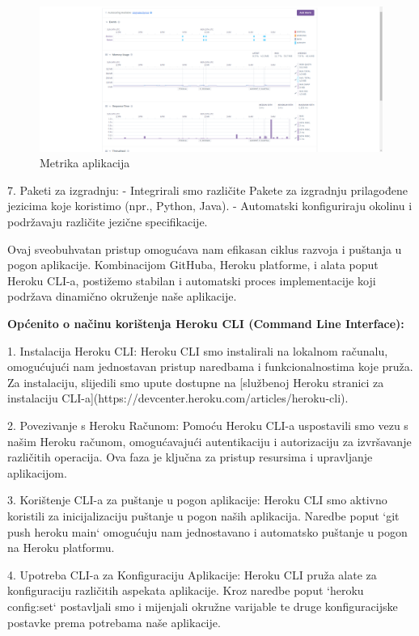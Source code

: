 \begin{figure}[H]
    \centering
    \includegraphics[width=1\linewidth]{slike/metrics.png}
    \caption{Metrika aplikacija}
    \label{fig:enter-label}
\end{figure}
7. Paketi za izgradnju:
   - Integrirali smo različite Pakete za izgradnju prilagođene jezicima koje koristimo (npr., Python, Java).
   - Automatski konfiguriraju okolinu i podržavaju različite jezične specifikacije.

Ovaj sveobuhvatan pristup omogućava nam efikasan ciklus razvoja i puštanja u pogon aplikacije. Kombinacijom GitHuba, Heroku platforme, i alata poput Heroku CLI-a, postižemo stabilan i automatski proces implementacije koji podržava dinamično okruženje naše aplikacije.


\textbf{Općenito o načinu korištenja Heroku CLI (Command Line Interface):}

1. Instalacija Heroku CLI:
   Heroku CLI smo instalirali na lokalnom računalu, omogućujući nam jednostavan pristup naredbama i funkcionalnostima koje pruža. Za instalaciju, slijedili smo upute dostupne na [službenoj Heroku stranici za instalaciju CLI-a](https://devcenter.heroku.com/articles/heroku-cli).

2. Povezivanje s Heroku Računom:
    Pomoću Heroku CLI-a uspostavili smo vezu s našim Heroku računom, omogućavajući autentikaciju i autorizaciju za izvršavanje različitih operacija. Ova faza je ključna za pristup resursima i upravljanje aplikacijom.

3. Korištenje CLI-a za puštanje u pogon aplikacije:
    Heroku CLI smo aktivno koristili za inicijalizaciju puštanje u pogon naših aplikacija. Naredbe poput `git push heroku main` omogućuju nam jednostavano i automatsko puštanje u pogon na Heroku platformu.

4. Upotreba CLI-a za Konfiguraciju Aplikacije:
    Heroku CLI pruža alate za konfiguraciju različitih aspekata aplikacije. Kroz naredbe poput `heroku config:set` postavljali smo i mijenjali okružne varijable te druge konfiguracijske postavke prema potrebama naše aplikacije.

